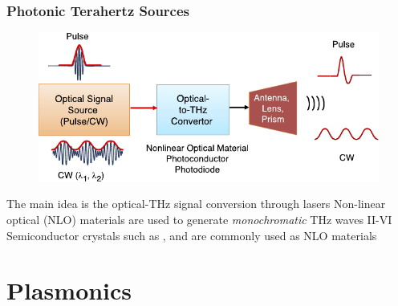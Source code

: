 \documentclass[10pt]{beamer}
\begin{document}
\begin{frame}
    \frametitle{Photonic Terahertz Sources}
    \begin{figure}[t!]
        \centering
        \includegraphics[width=.6\textwidth]{photonic_sources.pdf}
    \end{figure}
    \begin{outline}
        \1 The main idea is the optical-THz signal conversion through lasers
        \1 Non-linear optical (NLO) materials are used to generate \textit{monochromatic} THz waves
        \2 II-VI Semiconductor crystals such as , and  are commonly used as NLO materials
    \end{outline}
\end{frame}

\section{Plasmonics}
\end{document}
